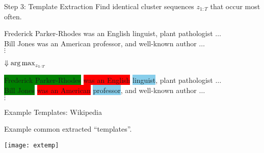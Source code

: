 \begin{frame}{Step 3: Template Extraction}
  Find identical cluster sequences $z_{1:T}$ that occur most often.
\air
\begin{center}


Frederick Parker-Rhodes  was an English linguist, plant pathologist $\ldots$ \\
Bill Jones  was an American professor, and well-known author $\ldots$\\
$\vdots$
\begin{center}
      $\Downarrow \argmax_{z_{1:T}}$
    \end{center}
\colorbox{green}{Frederick Parker-Rhodes}  \colorbox{red}{was an English} \colorbox{skyblue}{linguist}, \colorbox{redpurple}{plant pathologist} $\ldots$\\
\colorbox{green}{Bill Jones}  \colorbox{red}{was an American} \colorbox{skyblue}{professor}, \colorbox{redpurple}{and well-known author} $\ldots$\\
$\vdots$
\end{center}

\end{frame}




\begin{frame}{Example Templates: Wikipedia}

  Example common extracted ``templates''.

  \begin{center}
    \texttt{[image: extemp]}
  \end{center}
\end{frame}









